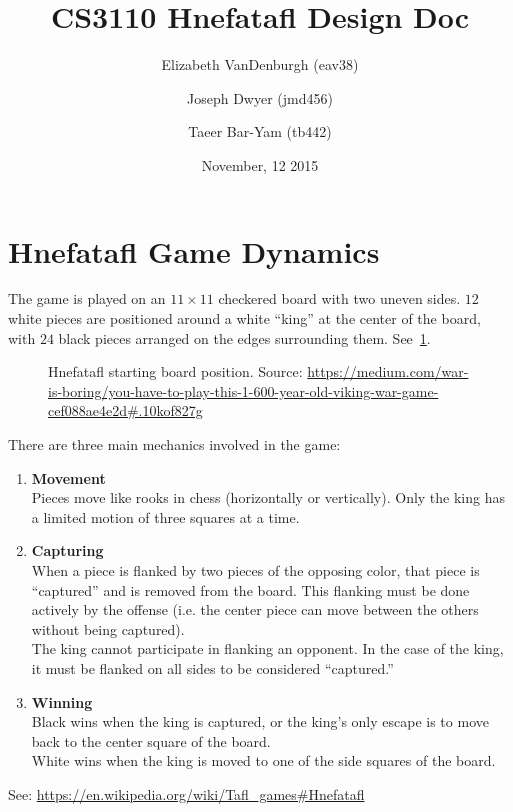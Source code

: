 \documentclass[11pt, oneside]{article}
\title{CS3110 Hnefatafl Design Doc}
\author{Elizabeth VanDenburgh (eav38)\and Joseph Dwyer (jmd456)\and Taeer Bar-Yam (tb442)}
\date{November, 12 2015}
\begin{document}
\maketitle

\section{Hnefatafl Game Dynamics}
The game is played on an $11\times 11$ checkered board with two uneven sides.
$12$ white pieces are positioned around a white ``king'' at the center of the
board, with $24$ black pieces arranged on the edges surrounding them.
See~\ref{fig:initial_position}.
\begin{figure}\label{fig:initial_position}
  \centering
  \caption{Hnefatafl starting board position. Source: \url{https://medium.com/war-is-boring/you-have-to-play-this-1-600-year-old-viking-war-game-cef088ae4e2d\#.10kof827g}}
\end{figure}
There are three main mechanics involved in the game:
\begin{enumerate}
\item \textbf{Movement}\\
  Pieces move like rooks in chess (horizontally or vertically).
  Only the king has a limited motion of three squares at a time.
\item \textbf{Capturing}\\
  When a piece is flanked by two pieces of the opposing color, that piece is
  ``captured'' and is removed from the board.  This flanking must be done actively
  by the offense (i.e. the center piece can move between the others without
  being captured).\\
  The king cannot participate in flanking an opponent. In the case of the king,
  it must be flanked on all sides to be considered ``captured.''
\item \textbf{Winning}\\
  Black wins when the king is captured, or the king's only escape is to move
  back to the center square of the board.\\
  White wins when the king is moved to one of the side squares of the board.
\end{enumerate}
See: \url{https://en.wikipedia.org/wiki/Tafl\_games\#Hnefatafl}
\end{document}
